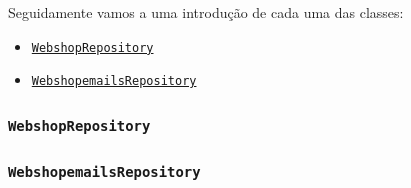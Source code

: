 Seguidamente vamos a uma introdução de cada uma das classes:
\begin{itemize}
  \item \hyperref[rep1]{\texttt{WebshopRepository}}
  \item \hyperref[rep2]{\texttt{WebshopemailsRepository}}
\end{itemize}

\newpage

\subsubsection*{\texttt{WebshopRepository}}\label{rep1}

\subsubsection*{\texttt{WebshopemailsRepository}}\label{rep2}

\newpage